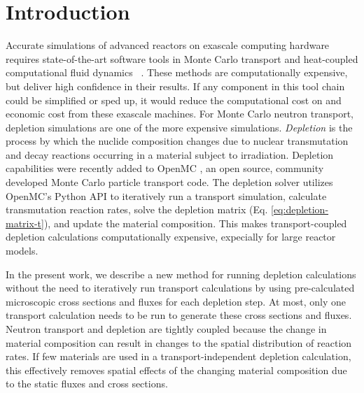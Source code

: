 \section{Introduction}\label{}

    Accurate simulations of advanced reactors on exascale computing hardware
    requires state-of-the-art software tools in Monte Carlo transport and
    heat-coupled computational fluid dynamics
    ~\citep{romano2021nse,merzari2023sc}.  These methods are computationally
    expensive, but deliver high confidence in their results. If any component in
    this tool chain could be simplified or sped up, it would reduce the
    computational cost on and economic cost from these exascale machines. For
    Monte Carlo neutron transport, depletion simulations are one of the more
    expensive simulations. {\it Depletion} is the process by which the nuclide
    composition changes due to nuclear transmutation and decay reactions
    occurring in a material subject to irradiation. Depletion capabilities were
    recently added \citep{ romano_depletion_2021} to OpenMC
    \citep{romano_openmc_2015}, an open source, community developed Monte Carlo
    particle transport code. The depletion solver utilizes OpenMC's Python API
    to iteratively run a transport simulation, calculate transmutation reaction
    rates, solve the depletion matrix (Eq. \ref{eq:depletion-matrix-t}), and
    update the material composition. This makes transport-coupled depletion
    calculations computationally expensive, expecially for large reactor models.
    
    In the present work, we describe a new method for running depletion
    calculations without the need to iteratively run transport calculations by
    using pre-calculated microscopic cross sections and fluxes for each depletion
    step. At most, only one transport calculation needs to be run to generate
    these cross sections and fluxes. Neutron transport and depletion are tightly
    coupled because the change in material composition can result in changes to
    the spatial distribution of reaction rates. If few materials are used in a
    transport-independent depletion calculation, this effectively removes
    spatial effects of the changing material composition due to the static
    fluxes and cross sections.

